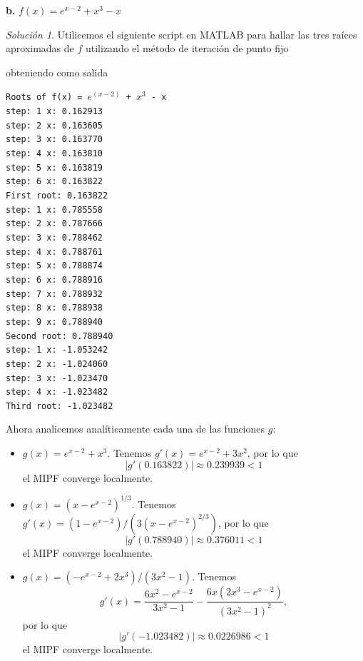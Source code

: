 \documentclass{article}
\newenvironment{statement}[1]{\smallskip\noindent\color[rgb]{1.00,0.00,0.50} {\bf #1.}}{}
\theoremstyle{definition}
\theoremstyle{remark}
\newtheorem*{solution}{Soluci\'on}
\begin{document}
\begin{statement}{b}
  $f(x) = e^{x - 2} + x^3 - x$
\end{statement}

\begin{solution}
  Utilicemos el siguiente script en MATLAB para hallar las tres ra\'ices aproximadas
  de $f$ utilizando el m\'etodo de iteraci\'on de punto fijo
  
  obteniendo como salida
  \begin{center}
    \texttt{Roots of f(x) = $e^(x - 2)$ + $x^3$ - x}\\
    \texttt{step: 1 x: 0.162913}\\
    \texttt{step: 2 x: 0.163605}\\
    \texttt{step: 3 x: 0.163770}\\
    \texttt{step: 4 x: 0.163810}\\
    \texttt{step: 5 x: 0.163819}\\
    \texttt{step: 6 x: 0.163822}\\
    \texttt{First root: 0.163822}\\
    \texttt{step: 1 x: 0.785558}\\
    \texttt{step: 2 x: 0.787666}\\
    \texttt{step: 3 x: 0.788462}\\
    \texttt{step: 4 x: 0.788761}\\
    \texttt{step: 5 x: 0.788874}\\
    \texttt{step: 6 x: 0.788916}\\
    \texttt{step: 7 x: 0.788932}\\
    \texttt{step: 8 x: 0.788938}\\
    \texttt{step: 9 x: 0.788940}\\
    \texttt{Second root: 0.788940}\\
    \texttt{step: 1 x: -1.053242}\\
    \texttt{step: 2 x: -1.024060}\\
    \texttt{step: 3 x: -1.023470}\\
    \texttt{step: 4 x: -1.023482}\\
    \texttt{Third root: -1.023482}
  \end{center}

  Ahora analicemos anal\'iticamente cada una de las funciones $g$:
  \begin{itemize}
    \item $g(x) = e^{x - 2} + x^3$. Tenemos $g'(x) = e^{x - 2} + 3x^2$, por lo que
    \[
      |g'(0.163822)| \approx 0.239939 < 1
    \]
    el MIPF converge localmente.
    \item $g(x) = (x - e^{x - 2})^{1 / 3}$. Tenemos $g'(x) = (1 - e^{x - 2}) / (3(x - e^{x - 2})^{2 / 3})$, por lo que
    \[
      |g'(0.788940)| \approx 0.376011 < 1
    \]
    el MIPF converge localmente.
    \item $g(x) = (-e^{x - 2} + 2x^3) / (3x^2 - 1)$. Tenemos
    \[
      g'(x) = \frac{6x^2 - e^{x - 2}}{3x^2 - 1} - \frac{6x(2x^3 - e^{x - 2})}{(3x^2 - 1)^2},
    \]
    por lo que
    \[
      |g'(-1.023482)| \approx 0.0226986 < 1
    \]
    el MIPF converge localmente.
  \end{itemize}
\end{solution}
\end{document}
